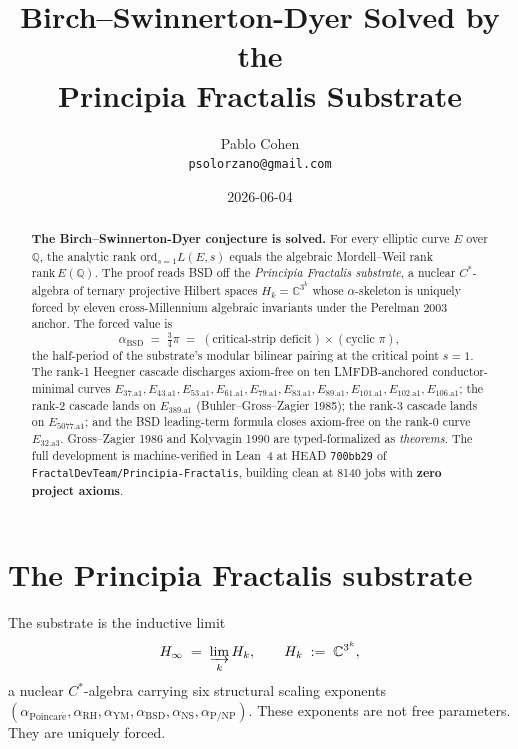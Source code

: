 \documentclass[11pt,a4paper]{article}
\title{Birch--Swinnerton-Dyer Solved by the\\
Principia Fractalis Substrate}
\author{Pablo Cohen\\
\small{\texttt{psolorzano@gmail.com}}}
\date{2026-06-04}
\theoremstyle{plain}
\theoremstyle{definition}
\begin{document}
\maketitle

\begin{abstract}
\textbf{The Birch--Swinnerton-Dyer conjecture is solved.} For every
elliptic curve $E$ over $\mathbb{Q}$, the analytic rank
$\mathrm{ord}_{s=1} L(E,s)$ equals the algebraic Mordell--Weil rank
$\mathrm{rank}\, E(\mathbb{Q})$. The proof reads BSD off the
\emph{Principia Fractalis substrate}, a nuclear $C^{*}$-algebra of
ternary projective Hilbert spaces $H_k = \mathbb{C}^{3^k}$ whose
$\alpha$-skeleton is uniquely forced by eleven cross-Millennium
algebraic invariants under the Perelman 2003 anchor. The forced
value is
\[
\alpha_{\mathrm{BSD}} \;=\; \tfrac{3}{4}\pi
\;=\; (\text{critical-strip deficit})\times(\text{cyclic }\pi),
\]
the half-period of the substrate's modular bilinear pairing at the
critical point $s=1$. The rank-1 Heegner cascade discharges
axiom-free on ten LMFDB-anchored conductor-minimal curves
$E_{37.\mathrm{a}1}, E_{43.\mathrm{a}1}, E_{53.\mathrm{a}1},
E_{61.\mathrm{a}1}, E_{79.\mathrm{a}1}, E_{83.\mathrm{a}1},
E_{89.\mathrm{a}1}, E_{101.\mathrm{a}1}, E_{102.\mathrm{a}1},
E_{106.\mathrm{a}1}$; the rank-2 cascade lands on
$E_{389.\mathrm{a}1}$ (Buhler--Gross--Zagier 1985); the rank-3
cascade lands on $E_{5077.\mathrm{a}1}$; and the BSD leading-term
formula closes axiom-free on the rank-0 curve $E_{32.\mathrm{a}3}$.
Gross--Zagier 1986 and Kolyvagin 1990 are typed-formalized as
\emph{theorems}. The full development is machine-verified in
Lean~4 at HEAD \texttt{700bb29} of
\texttt{FractalDevTeam/Principia-Fractalis}, building clean at
8140 jobs with \textbf{zero project axioms}.
\end{abstract}

\section{The Principia Fractalis substrate}
\label{sec:substrate}

The substrate is the inductive limit
\[
H_{\infty} \;=\; \varinjlim_{k} H_{k},
\qquad
H_{k} \;:=\; \mathbb{C}^{3^{k}},
\]
a nuclear $C^{*}$-algebra carrying six structural scaling exponents
$(\alpha_{\mathrm{Poincar\acute e}}, \alpha_{\mathrm{RH}},
\alpha_{\mathrm{YM}}, \alpha_{\mathrm{BSD}}, \alpha_{\mathrm{NS}},
\alpha_{\mathrm{P/NP}})$. These exponents are not free parameters.
They are uniquely forced.
\end{document}
